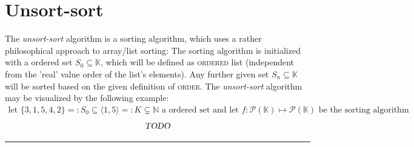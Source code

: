 \documentclass[pdftex,12pt,a4paper]{report}
\begin{document}
    \section{Unsort-sort}
    The \emph{unsort-sort} algorithm is a sorting algorithm, which uses a rather philosophical approach to array/list sorting:
    \newline
    The sorting algorithm is initialized with a ordered set $ S_0 \subseteq \mathbb{K} $, which will be defined as \textsc{ordered} list (independent from the 'real' value order of the list's elements). Any further given set $ S_n \subseteq \mathbb{K} $ will be sorted based on the given definition of \textsc{order}.
    \newline
    The \emph{unsort-sort} algorithm may be visualized by the following example:
    \begin{equation*}
        \begin{aligned}
            \text{let } \{3,1,5,4,2\} =: S_0 \subseteq \langle 1,5 \rangle =: K \subsetneq \mathbb{N} \text{ a ordered set and let }
            f : \mathcal{P}(\mathbb{K}) \mapsto \mathcal{P}(\mathbb{K}) \text{ be the sorting algorithm}
        \end{aligned}
    \end{equation*}
    \begin{equation*}
        \begin{aligned}
            \textsl{TODO}
        \end{aligned}
    \end{equation*}
    \vspace{5mm} \hrule
\end{document}
